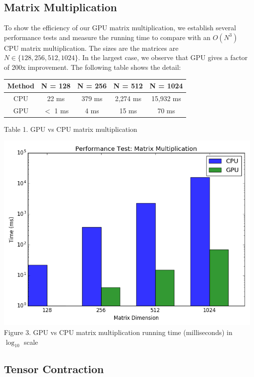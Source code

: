 \documentclass[a4paper]{article}
\begin{document}
\subsection{Matrix Multiplication}

To show the efficiency of our GPU matrix multiplication, we establish several performance tests and measure the running time to compare with an $O(N^3)$ CPU matrix multiplication. The sizes are the matrices are $N \in \{128, 256, 512, 1024\}$. In the largest case, we observe that GPU gives a factor of 200x improvement. The following table shows the detail:

\begin{center}
\begin{tabular}{||c | c | c | c | c ||}
	\hline
	Method & N = 128 & N = 256 & N = 512 & N = 1024 \\
	\hline\hline
	CPU & 22 ms & 379 ms & 2,274 ms & 15,932 ms \\
	\hline
	GPU & $<$ 1 ms & 4 ms & 15 ms & 70 ms \\
	\hline
\end{tabular}
Table 1. GPU vs CPU matrix multiplication
\end{center}

\begin{center}
\includegraphics[scale=0.28]{Matrix_Multiplication}
Figure 3. GPU vs CPU matrix multiplication running time (milliseconds) in $\log_{10}$ scale
\end{center}

\subsection{Tensor Contraction}
\end{document}
